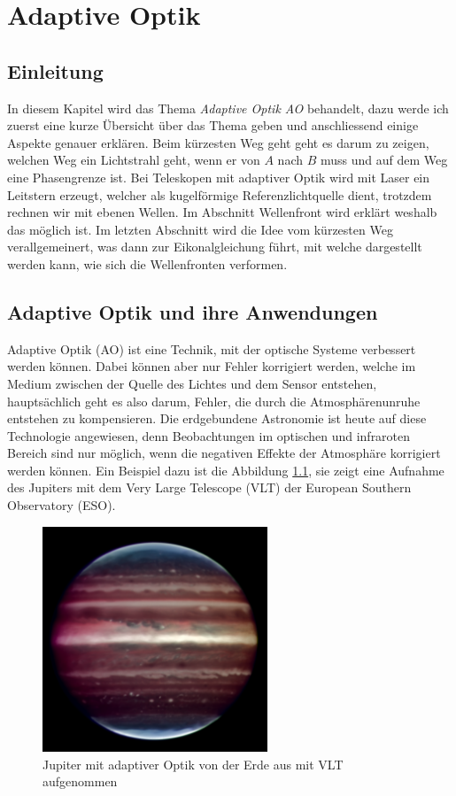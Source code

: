 \chapter{Adaptive Optik\label{chapter:thema}}
\begin{refsection}

\section{Einleitung}
In diesem Kapitel wird das Thema \textit{Adaptive Optik AO} behandelt, dazu werde ich zuerst eine kurze Übersicht über das Thema geben und anschliessend einige Aspekte genauer erklären. Beim kürzesten Weg geht geht es darum zu zeigen, welchen Weg ein Lichtstrahl geht, wenn er von $A$ nach $B$ muss und auf dem Weg eine Phasengrenze ist. Bei Teleskopen mit adaptiver Optik wird mit Laser ein Leitstern erzeugt, welcher als kugelförmige Referenzlichtquelle dient, trotzdem rechnen wir mit ebenen Wellen. Im Abschnitt Wellenfront wird erklärt weshalb das möglich ist. Im letzten Abschnitt wird die Idee vom kürzesten Weg verallgemeinert, was dann zur Eikonalgleichung führt, mit welche dargestellt werden kann, wie sich die Wellenfronten verformen. 

\section{Adaptive Optik und ihre Anwendungen}
Adaptive Optik (AO) ist eine Technik, mit der optische Systeme verbessert werden können. Dabei können aber nur Fehler korrigiert werden, welche im Medium zwischen der Quelle des Lichtes und dem Sensor entstehen, hauptsächlich geht es also darum, Fehler, die durch die Atmosphärenunruhe entstehen zu kompensieren. Die erdgebundene Astronomie ist heute auf diese Technologie angewiesen, denn Beobachtungen im optischen und infraroten Bereich sind nur möglich, wenn die negativen Effekte der Atmosphäre korrigiert werden können. Ein Beispiel dazu ist die Abbildung \ref{fig:jupiter}, sie zeigt eine Aufnahme des Jupiters mit dem Very Large Telescope (VLT) der European Southern Observatory (ESO).
\begin{figure}
  \centering
  \includegraphics[width=0.6\textwidth]{adaptiv/images/Jupiter_adaptiv}
  \caption{Jupiter mit adaptiver Optik von der Erde aus mit VLT aufgenommen
    \cite{eso:jupiter}}
  \label{fig:jupiter}
\end{figure}


\end{refsection}
